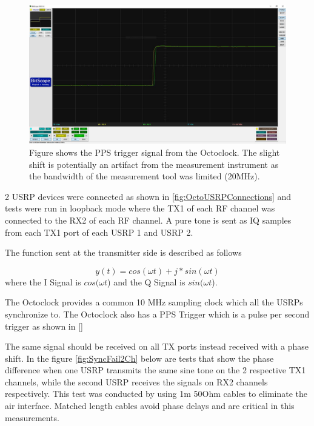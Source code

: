 \begin{figure}[H]
    \centering
    \includegraphics[width=\linewidth]{images/PPSTrigZoomIn.jpg}
    \caption{Figure shows the PPS trigger signal from the Octoclock. The slight shift is potentially an artifact from the measurement instrument as the bandwidth of the measurement tool was limited (20MHz).}
    \label{fig:}%
\end{figure}

2 USRP devices were connected as shown in \ref{fig:OctoUSRPConnections} and tests were run in loopback mode where the TX1 of each RF channel was connected to the RX2 of each RF channel. A pure tone is sent as IQ samples from each TX1 port of each USRP 1 and USRP 2.

The function sent at the transmitter side is described as follows

\begin{equation}
    y(t) = cos(\omega{t}) + j*sin(\omega{t})
\end{equation}
where the I Signal is $cos(\omega{t}$) and the Q Signal is $sin(\omega{t}$).

The Octoclock provides a common 10 MHz sampling clock which all the USRPs synchronize to. The Octoclock also has a PPS Trigger which is a pulse per second trigger as shown in \ref{}

The same signal should be received on all TX ports instead received with a phase shift. In the figure \ref{fig:SyncFail2Ch} below are tests that show the phase difference when one USRP transmits the same sine tone on the 2 respective TX1 channels, while the second USRP receives the signals on RX2 channels respectively. This test was conducted by using 1m 50Ohm cables to eliminate the air interface. Matched length cables avoid phase delays and are critical in this measurements.

